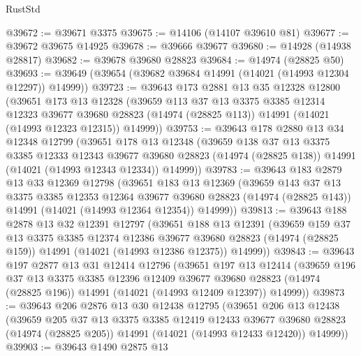 \begin{lexlean}{RustStd}
\begin{coremodule}
@39672 := @39671 @3375
@39675 := @14106 (@14107 @39610 @81)
@39677 := @39672 @39675 @14925
@39678 := @39666 @39677
@39680 := @14928 (@14938 @28817)
@39682 := @39678 @39680 @28823
@39684 := @14974 (@28825 @50)
@39693 := @39649 (@39654 (@39682 @39684 @14991 (@14021 (@14993 @12304 @12297)) @14999))
@39723 := @39643
    @173
    @2881
    @13
    @35
    @12328
    @12800
    (@39651
      @173
      @13
      @12328
      (@39659
        @113
        @37
        @13
        @3375
        @3385
        @12314
        @12323
        @39677
        @39680
        @28823
        (@14974 (@28825 @113))
        @14991
        (@14021 (@14993 @12323 @12315))
        @14999))
@39753 := @39643
    @178
    @2880
    @13
    @34
    @12348
    @12799
    (@39651
      @178
      @13
      @12348
      (@39659
        @138
        @37
        @13
        @3375
        @3385
        @12333
        @12343
        @39677
        @39680
        @28823
        (@14974 (@28825 @138))
        @14991
        (@14021 (@14993 @12343 @12334))
        @14999))
@39783 := @39643
    @183
    @2879
    @13
    @33
    @12369
    @12798
    (@39651
      @183
      @13
      @12369
      (@39659
        @143
        @37
        @13
        @3375
        @3385
        @12353
        @12364
        @39677
        @39680
        @28823
        (@14974 (@28825 @143))
        @14991
        (@14021 (@14993 @12364 @12354))
        @14999))
@39813 := @39643
    @188
    @2878
    @13
    @32
    @12391
    @12797
    (@39651
      @188
      @13
      @12391
      (@39659
        @159
        @37
        @13
        @3375
        @3385
        @12374
        @12386
        @39677
        @39680
        @28823
        (@14974 (@28825 @159))
        @14991
        (@14021 (@14993 @12386 @12375))
        @14999))
@39843 := @39643
    @197
    @2877
    @13
    @31
    @12414
    @12796
    (@39651
      @197
      @13
      @12414
      (@39659
        @196
        @37
        @13
        @3375
        @3385
        @12396
        @12409
        @39677
        @39680
        @28823
        (@14974 (@28825 @196))
        @14991
        (@14021 (@14993 @12409 @12397))
        @14999))
@39873 := @39643
    @206
    @2876
    @13
    @30
    @12438
    @12795
    (@39651
      @206
      @13
      @12438
      (@39659
        @205
        @37
        @13
        @3375
        @3385
        @12419
        @12433
        @39677
        @39680
        @28823
        (@14974 (@28825 @205))
        @14991
        (@14021 (@14993 @12433 @12420))
        @14999))
@39903 := @39643
    @1490
    @2875
    @13

\end{coremodule}
\end{lexlean}
